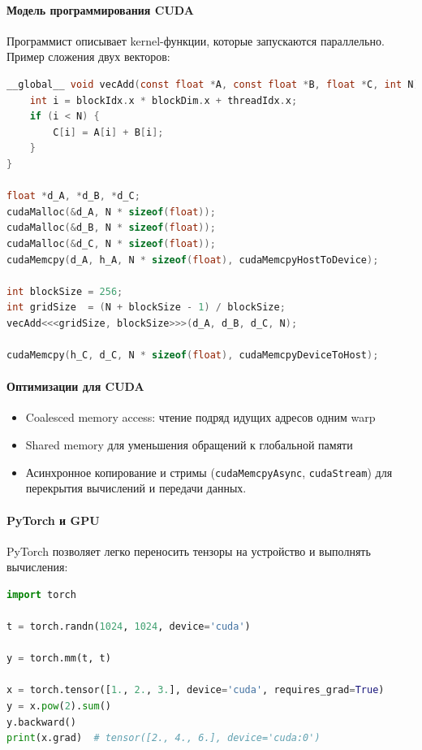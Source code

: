 \paragraph{Модель программирования CUDA}
Программист описывает kernel-функции, которые запускаются параллельно. Пример сложения двух векторов:

\begin{lstlisting}[language=C,caption={CUDA: сложение векторов},label={lst:cuda_vecadd}]
__global__ void vecAdd(const float *A, const float *B, float *C, int N) {
    int i = blockIdx.x * blockDim.x + threadIdx.x;
    if (i < N) {
        C[i] = A[i] + B[i];
    }
}

float *d_A, *d_B, *d_C;
cudaMalloc(&d_A, N * sizeof(float));
cudaMalloc(&d_B, N * sizeof(float));
cudaMalloc(&d_C, N * sizeof(float));
cudaMemcpy(d_A, h_A, N * sizeof(float), cudaMemcpyHostToDevice);

int blockSize = 256;
int gridSize  = (N + blockSize - 1) / blockSize;
vecAdd<<<gridSize, blockSize>>>(d_A, d_B, d_C, N);

cudaMemcpy(h_C, d_C, N * sizeof(float), cudaMemcpyDeviceToHost);
\end{lstlisting}

\paragraph{Оптимизации для CUDA}
\begin{itemize}
  \item Coalesced memory access: чтение подряд идущих адресов одним warp\;
  \item Shared memory для уменьшения обращений к глобальной памяти\;
  \item Асинхронное копирование и стримы (\texttt{cudaMemcpyAsync}, \texttt{cudaStream}) для перекрытия вычислений и передачи данных.
\end{itemize}

\paragraph{PyTorch и GPU}
PyTorch позволяет легко переносить тензоры на устройство и выполнять вычисления:

\begin{lstlisting}[language=Python,caption={PyTorch: базовые операции на GPU},label={lst:torch_gpu}]
import torch

t = torch.randn(1024, 1024, device='cuda')

y = torch.mm(t, t)

x = torch.tensor([1., 2., 3.], device='cuda', requires_grad=True)
y = x.pow(2).sum()
y.backward()
print(x.grad)  # tensor([2., 4., 6.], device='cuda:0')
\end{lstlisting}


